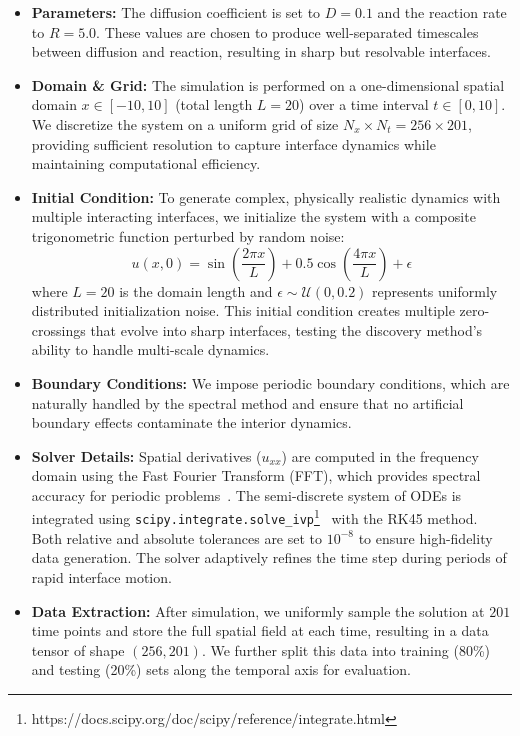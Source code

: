 \begin{itemize}
    \item \textbf{Parameters:} The diffusion coefficient is set to $D=0.1$ and the reaction rate to $R=5.0$. These values are chosen to produce well-separated timescales between diffusion and reaction, resulting in sharp but resolvable interfaces.
    
    \item \textbf{Domain \& Grid:} The simulation is performed on a one-dimensional spatial domain $x \in [-10, 10]$ (total length $L=20$) over a time interval $t \in [0, 10]$. We discretize the system on a uniform grid of size $N_x \times N_t = 256 \times 201$, providing sufficient resolution to capture interface dynamics while maintaining computational efficiency.
    
    \item \textbf{Initial Condition:} To generate complex, physically realistic dynamics with multiple interacting interfaces, we initialize the system with a composite trigonometric function perturbed by random noise:
    \begin{equation}
        u(x,0) = \sin\left(\frac{2\pi x}{L}\right) + 0.5\cos\left(\frac{4\pi x}{L}\right) + \epsilon
    \end{equation}
    where $L=20$ is the domain length and $\epsilon \sim \mathcal{U}(0, 0.2)$ represents uniformly distributed initialization noise. This initial condition creates multiple zero-crossings that evolve into sharp interfaces, testing the discovery method's ability to handle multi-scale dynamics.
    
    \item \textbf{Boundary Conditions:} We impose periodic boundary conditions, which are naturally handled by the spectral method and ensure that no artificial boundary effects contaminate the interior dynamics.
    
    \item \textbf{Solver Details:} Spatial derivatives ($u_{xx}$) are computed in the frequency domain using the Fast Fourier Transform (FFT), which provides spectral accuracy for periodic problems~\cite{trefethen2000spectral}. The semi-discrete system of ODEs is integrated using \texttt{scipy.integrate.solve\_ivp}\footnote{https://docs.scipy.org/doc/scipy/reference/integrate.html}~\cite{virtanen2020scipy} with the RK45 method. Both relative and absolute tolerances are set to $10^{-8}$ to ensure high-fidelity data generation. The solver adaptively refines the time step during periods of rapid interface motion.
    
    \item \textbf{Data Extraction:} After simulation, we uniformly sample the solution at $201$ time points and store the full spatial field at each time, resulting in a data tensor of shape $(256, 201)$. We further split this data into training (80\%) and testing (20\%) sets along the temporal axis for evaluation.
\end{itemize}

